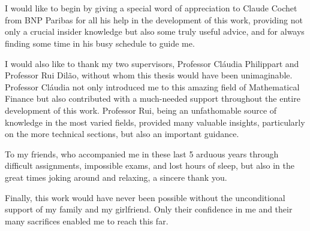 
\section*{\acknowledgments}

I would like to begin by giving a special word of appreciation to Claude Cochet from BNP Paribas for all his help in the development of this work, providing not only a crucial insider knowledge but also some truly useful advice, and for always finding some time in his busy schedule to guide me.

I would also like to thank my two supervisors, Professor Cláudia Philippart and Professor Rui Dilão, without whom this thesis would have been unimaginable. Professor Cláudia not only introduced me to this amazing field of Mathematical Finance but also contributed with a much-needed support throughout the entire development of this work. Professor Rui, being an unfathomable source of knowledge in the most varied fields, provided many valuable insights, particularly on the more technical sections, but also an important guidance.

To my friends, who accompanied me in these last 5 arduous years through difficult assignments, impossible exams, and lost hours of sleep, but also in the great times joking around and relaxing, a sincere thank you.

Finally, this work would have never been possible without the unconditional support of my family and my girlfriend. Only their confidence in me and their many sacrifices enabled me to reach this far.

